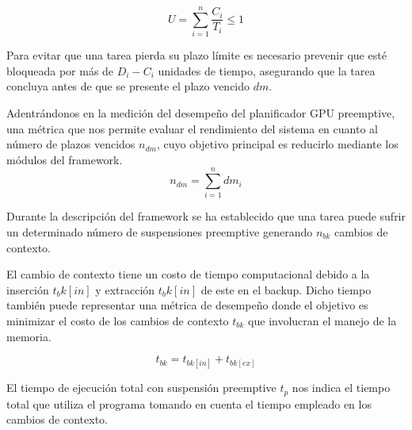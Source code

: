 \begin{equation}
U=\sum_{i=1}^{n} \frac{C_i}{T_i} \leq 1
\end{equation}

Para evitar que una tarea pierda su plazo límite es necesario prevenir que esté bloqueada por más de \textit{$D_i - C_i$} unidades de tiempo, asegurando que la tarea concluya antes de que se presente el plazo vencido $dm$.
\newline

Adentrándonos en la medición del desempeño del planificador GPU preemptive, una métrica que nos permite evaluar el rendimiento del sistema en cuanto al número de plazos vencidos \textit{$n_{dm}$}, cuyo objetivo principal es reducirlo mediante los módulos del framework.
\begin{equation}
n_{dm}=\sum_{i=1}^{n} dm_{i}
\end{equation}

Durante la descripción del framework se ha establecido que una tarea puede sufrir un determinado número de suspensiones preemptive generando \textit{$n_{bk}$} cambios de contexto. 

El cambio de contexto tiene un costo de tiempo computacional debido a la inserción \textit{$t_bk[in]$} y extracción \textit{$t_bk[in]$} de este en el backup. Dicho tiempo también puede representar una métrica de desempeño donde el objetivo es minimizar el costo de los cambios de contexto \textit{$t_{bk}$} que involucran el manejo de la memoria.

\begin{equation}
t_{bk}=t_{bk[in]}+t_{bk[ex]}
\end{equation}

El tiempo de ejecución total con suspensión preemptive \textit{$t_p$} nos indica el tiempo total que utiliza el programa tomando en cuenta el tiempo empleado en los cambios de contexto. 
\newline

